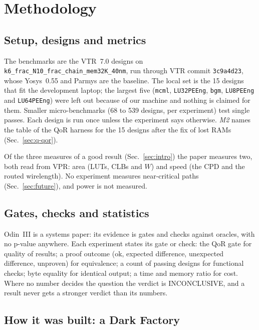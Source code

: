 \documentclass[conference]{IEEEtran}
\newcommand{\code}[1]{\texttt{#1}}
\begin{document}
\section{Methodology}
\label{sec:methodology}

\subsection{Setup, designs and metrics}

The benchmarks are the VTR~7.0 designs on \code{k6\_frac\_N10\_frac\_chain\_mem32K\_40nm}, run through VTR commit \code{3c9a4d23}, whose Yosys~0.55 and Parmys are the baseline. The local set is the 15 designs that fit the development laptop; the largest five (\code{mcml}, \code{LU32PEEng}, \code{bgm}, \code{LU8PEEng} and \code{LU64PEEng}) were left out because of our machine and nothing is claimed for them. Smaller micro-benchmarks (68 to 539 designs, per experiment) test single passes. Each design is run once unless the experiment says otherwise. \emph{M2} names the table of the QoR harness for the 15 designs after the fix of lost RAMs (Sec.~\ref{sec:q-qor}).

Of the three measures of a good result (Sec.~\ref{sec:intro}) the paper measures two, both read from VPR: area (LUTs, CLBs and $W$) and speed (the CPD and the routed wirelength). No experiment measures near-critical paths (Sec.~\ref{sec:future}), and power is not measured.

\subsection{Gates, checks and statistics}

Odin~III is a systems paper: its evidence is gates and checks against oracles, with no p-value anywhere. Each experiment states its gate or check: the QoR gate for quality of results; a proof outcome (ok, expected difference, unexpected difference, unproven) for equivalence; a count of passing designs for functional checks; byte equality for identical output; a time and memory ratio for cost. Where no number decides the question the verdict is INCONCLUSIVE, and a result never gets a stronger verdict than its numbers.

\subsection{How it was built: a Dark Factory}
\label{sec:method-built}
\end{document}

